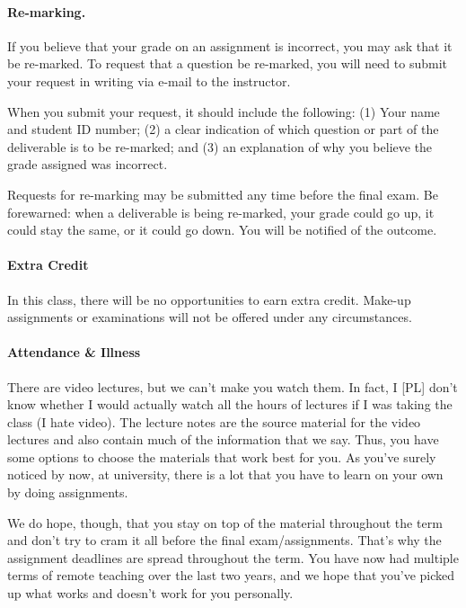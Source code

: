 \documentclass[letterpaper,10pt]{article}
\begin{document}
\paragraph{Re-marking.}
If you believe that your grade on an assignment is incorrect, you may ask that it be re-marked. To request that a question be re-marked, you will need to submit your request in writing via e-mail to the instructor.

When you submit your request, it should include the following: (1) Your name and student ID number; (2) a clear indication of which question or part of the deliverable is to be re-marked; and (3) an explanation of why you believe the grade assigned was incorrect.

Requests for re-marking may be submitted any time before the final exam. Be forewarned: when a deliverable is being re-marked, your grade could go up, it could stay the same, or it could go down. You will be notified of the outcome.

\paragraph{Extra Credit}
In this class, there will be no opportunities to earn extra credit. Make-up assignments or examinations will not be offered under any circumstances.

\paragraph{Attendance \& Illness}

There are video lectures, but we can't make you watch them. In fact, I [PL] don't know whether I would actually watch all the hours of lectures if I was taking the class (I hate video). The lecture notes are the source material for the video lectures and also contain much of the information that we say. Thus, you have some options to choose the materials that work best for you. As you've surely noticed by now, at university, there is a lot that you have to learn on your own by doing assignments.

We do hope, though, that you stay on top of the material throughout the term and don't try to cram it all before the final exam/assignments. That's why the assignment deadlines are spread throughout the term. You have now had multiple terms of remote teaching over the last two years, and we hope that you've picked up what works and doesn't work for you personally.

\end{document}

